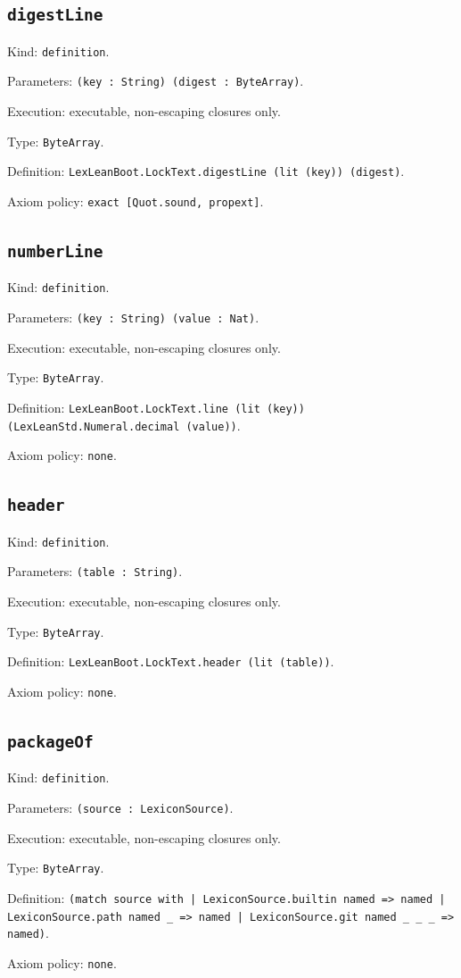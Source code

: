 \documentclass[11pt]{article}
\begin{document}
\subsection*{\texttt{digestLine}}
\noindent Kind: \texttt{definition}.\par
\noindent Parameters: \texttt{(key : String) (digest : ByteArray)}.\par
\noindent Execution: executable, non-escaping closures only.\par
\noindent Type: \texttt{ByteArray}.\par
\noindent Definition: \texttt{LexLeanBoot.LockText.digestLine (lit (key)) (digest)}.\par
\noindent Axiom policy: \texttt{exact [Quot.sound, propext]}.\par
\subsection*{\texttt{numberLine}}
\noindent Kind: \texttt{definition}.\par
\noindent Parameters: \texttt{(key : String) (value : Nat)}.\par
\noindent Execution: executable, non-escaping closures only.\par
\noindent Type: \texttt{ByteArray}.\par
\noindent Definition: \texttt{LexLeanBoot.LockText.line (lit (key)) (LexLeanStd.Numeral.decimal (value))}.\par
\noindent Axiom policy: \texttt{none}.\par
\subsection*{\texttt{header}}
\noindent Kind: \texttt{definition}.\par
\noindent Parameters: \texttt{(table : String)}.\par
\noindent Execution: executable, non-escaping closures only.\par
\noindent Type: \texttt{ByteArray}.\par
\noindent Definition: \texttt{LexLeanBoot.LockText.header (lit (table))}.\par
\noindent Axiom policy: \texttt{none}.\par
\subsection*{\texttt{packageOf}}
\noindent Kind: \texttt{definition}.\par
\noindent Parameters: \texttt{(source : LexiconSource)}.\par
\noindent Execution: executable, non-escaping closures only.\par
\noindent Type: \texttt{ByteArray}.\par
\noindent Definition: \texttt{(match source with | LexiconSource.builtin named => named | LexiconSource.path named \_ => named | LexiconSource.git named \_ \_ \_ => named)}.\par
\noindent Axiom policy: \texttt{none}.\par
\end{document}
